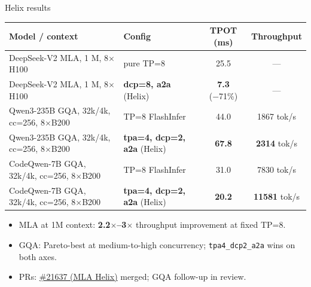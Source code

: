 \documentclass[aspectratio=169,10pt]{beamer}
\begin{document}
\begin{frame}{Helix results}
  \footnotesize
  \begin{tabular}{l l c c}
    \toprule
    Model / context          & Config                                      & TPOT (ms) & Throughput \\
    \midrule
    DeepSeek-V2 MLA, 1 M, 8$\times$H100     & pure TP=8                         & 25.5 & --- \\
    DeepSeek-V2 MLA, 1 M, 8$\times$H100     & \textbf{dcp=8, a2a} (Helix)       & \textbf{7.3} (−71\%) & --- \\
    \midrule
    Qwen3-235B GQA, 32k/4k, cc=256, 8$\times$B200 & TP=8 FlashInfer            & 44.0 & 1867 tok/s \\
    Qwen3-235B GQA, 32k/4k, cc=256, 8$\times$B200 & \textbf{tpa=4, dcp=2, a2a} (Helix) & \textbf{67.8} & \textbf{2314} tok/s  \\
    \midrule
    CodeQwen-7B GQA, 32k/4k, cc=256, 8$\times$B200 & TP=8 FlashInfer           & 31.0 &  7830 tok/s \\
    CodeQwen-7B GQA, 32k/4k, cc=256, 8$\times$B200 & \textbf{tpa=4, dcp=2, a2a} (Helix) & \textbf{20.2} & \textbf{11581} tok/s \\
    \bottomrule
  \end{tabular}
  \vspace{0.4cm}
  \begin{itemize}\scriptsize
    \item MLA at 1M context: \textbf{2.2$\times$--3$\times$} throughput improvement at fixed TP=8.
    \item GQA: Pareto-best at medium-to-high concurrency; \texttt{tpa4\_dcp2\_a2a} wins on both axes.
    \item PRs: \href{https://github.com/sgl-project/sglang/pull/21637}{\textcolor{slblue}{\#21637 (MLA Helix)}} merged; GQA follow-up in review.
  \end{itemize}
\end{frame}
\end{document}
